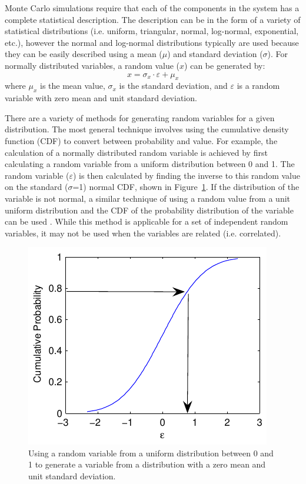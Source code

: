 \documentclass[12pt,oneside]{book}
\begin{document}
Monte Carlo simulations require that each of the components in the system has a complete statistical
description.  The description can be in the form of a variety of statistical distributions (i.e.
uniform, triangular, normal, log-normal, exponential, etc.), however the normal and log-normal
distributions typically are used because they can be easily described using a mean ($\mu$) and
standard deviation ($\sigma$).  For normally distributed variables, a random value ($x$) can be
generated by:
\begin{equation}
    x = \sigma_x \cdot \varepsilon + \mu_x
    \label{eq:randVar}
\end{equation}
where $\mu_x$ is the mean value, $\sigma_x$ is the standard deviation, and $\varepsilon$ is a random
variable with zero mean and unit standard deviation.  

There are a variety of methods for generating random variables for a given distribution.  The most
general technique involves using the cumulative density function (CDF) to convert between
probability and value.  For example, the calculation of a normally distributed random variable is
achieved by first calculating a random variable from a uniform distribution between 0 and 1.  The
random variable ($\varepsilon$) is then calculated by finding the inverse to this random value on
the standard ($\sigma$=1) normal CDF, shown in Figure~\ref{fig:rand:variable}.  If the distribution
of the variable is not normal, a similar technique of using a random value from a unit uniform
distribution and the CDF of the probability distribution of the variable can be used
\citep{ang:vol2}.  While this method is applicable for a set of independent random variables, it may
not be used when the variables are related (i.e. correlated).

\begin{figure}[tb]
    \begin{center}
        \includegraphics{figures/rand/variable.pdf}
    \end{center}
    \caption{Using a random variable from a uniform distribution between 0 and 1 to generate a
    variable from a distribution with a zero mean and unit standard deviation.}
    \label{fig:rand:variable}
\end{figure}
\end{document}
